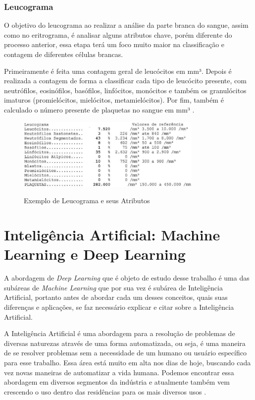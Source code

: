 \subsubsection{Leucograma}
O objetivo do leucograma ao realizar a análise da parte branca do sangue, assim como no eritrograma, é analisar alguns atributos chave, porém diferente do processo anterior, essa etapa terá um foco muito maior na classificação e contagem de diferentes células brancas.

Primeiramente é feita uma contagem geral de leucócitos em mm³. Depois é realizada a contagem de forma a classificar cada tipo de leucócito presente, com neutrófilos, eosinófilos, basófilos, linfócitos, monócitos e também os granulócitos imaturos (promielócitos, mielócitos, metamielócitos). Por fim, também é calculado o número presente de plaquetas no sangue em mm³ \cite{interpretacaoHemograma, manualHematologia}.

\begin{figure}[!htb]
	\centering
	\caption{Exemplo de Leucograma e seus Atributos}
	\includegraphics[width=0.80\textwidth]{img/leucograma.jpg}
	\label{fig:leucograma}
\end{figure}

\section{Inteligência Artificial: Machine Learning e Deep Learning}
\label{sec:conceito2}
A abordagem de \emph{Deep Learning} que é objeto de estudo desse trabalho é uma das subáreas de \emph{Machine Learning} que por sua vez é subárea de Inteligência Artificial, portanto antes de abordar cada um desses conceitos, quais suas diferenças e aplicações, se faz necessário explicar e citar sobre a Inteligência Artificial.

A Inteligência Artificial é uma abordagem para a resolução de problemas de diversas naturezas através de uma forma automatizada, ou seja, é uma maneira de se resolver problemas sem a necessidade de um humano ou usuário específico para esse trabalho. Essa área está muito em alta nos dias de hoje, buscando cada vez novas maneiras de automatizar a vida humana. Podemos encontrar essa abordagem em diversos segmentos da indústria e atualmente também vem crescendo o uso dentro das residências para os mais diversos usos \cite{inteligenciaArtificial}.

